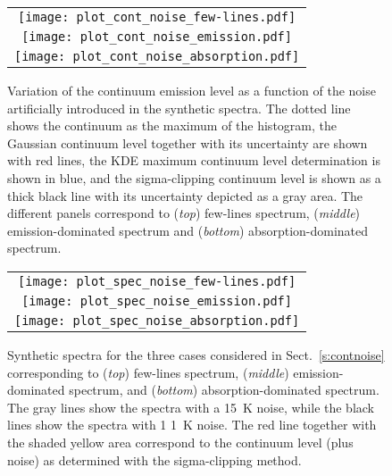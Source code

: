 \documentclass{aa}
\begin{document}
\begin{figure}[t]
\begin{center}
\begin{tabular}[b]{c}
        \texttt{[image: plot\_cont\_noise\_few-lines.pdf]} \\
        \texttt{[image: plot\_cont\_noise\_emission.pdf]} \\
        \texttt{[image: plot\_cont\_noise\_absorption.pdf]} \\
\end{tabular}
\caption{Variation of the continuum emission level as a function of the noise artificially introduced in the synthetic spectra. The dotted line shows the continuum as the maximum of the histogram, the Gaussian continuum level together with its uncertainty are shown with red lines, the KDE maximum continuum level determination is shown in blue, and the sigma-clipping continuum level is shown as a thick black line with its uncertainty depicted as a gray area. The different panels correspond to (\textit{top}) few-lines spectrum, (\textit{middle}) emission-dominated spectrum and (\textit{bottom}) absorption-dominated spectrum.}
\label{f:contnoise}
\end{center}
\end{figure}

\begin{figure}[t]
\begin{center}
\begin{tabular}[b]{c}
        \texttt{[image: plot\_spec\_noise\_few-lines.pdf]} \\
        \texttt{[image: plot\_spec\_noise\_emission.pdf]} \\
        \texttt{[image: plot\_spec\_noise\_absorption.pdf]} \\
\end{tabular}
\caption{Synthetic spectra for the three cases considered in Sect.~\ref{s:contnoise} corresponding to (\textit{top}) few-lines spectrum, (\textit{middle}) emission-dominated spectrum, and (\textit{bottom}) absorption-dominated spectrum. The gray lines show the spectra with a 15~K noise, while the black lines show the spectra with 1 1~K noise. The red line together with the shaded yellow area correspond to the continuum level (plus noise) as determined with the sigma-clipping method.}
\label{f:specnoise}
\end{center}
\end{figure}
\end{document}
